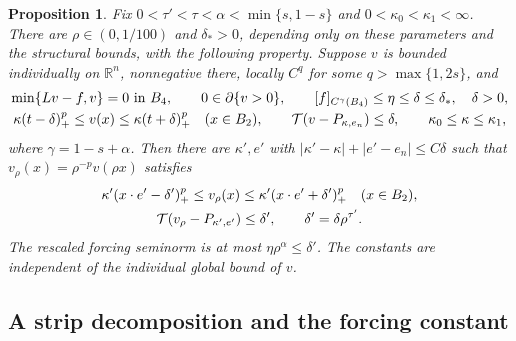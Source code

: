 \documentclass[11pt]{article}
\newtheorem{proposition}[theorem]{Proposition}
\numberwithin{equation}{section}
\newcommand{\R}{\mathbb R}
\newcommand{\T}{\mathcal T}
\begin{document}
\begin{proposition}\label{prop:improvement}
Fix $0<\tau'<\tau<\alpha<\min\{s,1-s\}$ and
$0<\kappa_0<\kappa_1<\infty$. There are $\rho\in(0,1/100)$ and
$\delta_*>0$, depending only on these parameters and the structural bounds,
with the following property. Suppose $v$ is bounded individually on
$\R^n$, nonnegative there, locally $C^q$ for some $q>\max\{1,2s\}$, and
\begin{gather}\label{eq:slab-input}
 \min\{Lv-f,v\}=0\ \hbox{in }B_4,\qquad 0\in\partial\{v>0\},\qquad
 [f]_{C^\gamma(B_4)}\leq\eta\leq\delta\leq\delta_*,\quad \delta>0,
 \\
 \kappa(t-\delta)_+^p\leq v(x)\leq\kappa(t+\delta)_+^p
                   \quad(x\in B_2),\qquad
 \T(v-P_{\kappa,e_n})\leq\delta,\qquad
 \kappa_0\leq\kappa\leq\kappa_1,\notag
\end{gather}
where $\gamma=1-s+\alpha$. Then there are $\kappa',e'$ with
$|\kappa'-\kappa|+|e'-e_n|\leq C\delta$ such that
$v_\rho(x)=\rho^{-p}v(\rho x)$ satisfies
\begin{gather}\label{eq:slab-output}
 \kappa'(x\cdot e'-\delta')_+^p\leq v_\rho(x)
                    \leq\kappa'(x\cdot e'+\delta')_+^p
                         \quad(x\in B_2),\\
 \T(v_\rho-P_{\kappa',e'})\leq\delta',\qquad
             \delta'=\delta\rho^{\tau'} .\notag
\end{gather}
The rescaled forcing seminorm is at most $\eta\rho^\alpha\leq\delta'$.
The constants are independent of the individual global bound of $v$.
\end{proposition}

\subsection{A strip decomposition and the forcing constant}
\end{document}
